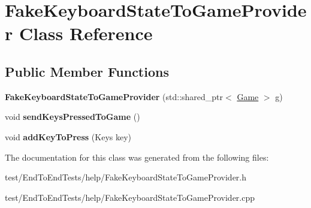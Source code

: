 \hypertarget{classFakeKeyboardStateToGameProvider}{}\section{Fake\+Keyboard\+State\+To\+Game\+Provider Class Reference}
\label{classFakeKeyboardStateToGameProvider}
\subsection*{Public Member Functions}
\begin{DoxyCompactItemize}
\item 
{\bfseries Fake\+Keyboard\+State\+To\+Game\+Provider} (std\+::shared\+\_\+ptr$<$ \hyperlink{classGame}{Game} $>$ g)\hypertarget{classFakeKeyboardStateToGameProvider_ac597dea55fea1f02a24d79d9f8fd5c33}{}\label{classFakeKeyboardStateToGameProvider_ac597dea55fea1f02a24d79d9f8fd5c33}

\item 
void {\bfseries send\+Keys\+Pressed\+To\+Game} ()\hypertarget{classFakeKeyboardStateToGameProvider_ace89c06296463d0c858c77f6aa4ed1b8}{}\label{classFakeKeyboardStateToGameProvider_ace89c06296463d0c858c77f6aa4ed1b8}

\item 
void {\bfseries add\+Key\+To\+Press} (Keys key)\hypertarget{classFakeKeyboardStateToGameProvider_ada79c8c393bf6c6aba1e3247973c4e62}{}\label{classFakeKeyboardStateToGameProvider_ada79c8c393bf6c6aba1e3247973c4e62}

\end{DoxyCompactItemize}


The documentation for this class was generated from the following files\+:\begin{DoxyCompactItemize}
\item 
test/\+End\+To\+End\+Tests/help/Fake\+Keyboard\+State\+To\+Game\+Provider.\+h\item 
test/\+End\+To\+End\+Tests/help/Fake\+Keyboard\+State\+To\+Game\+Provider.\+cpp\end{DoxyCompactItemize}
